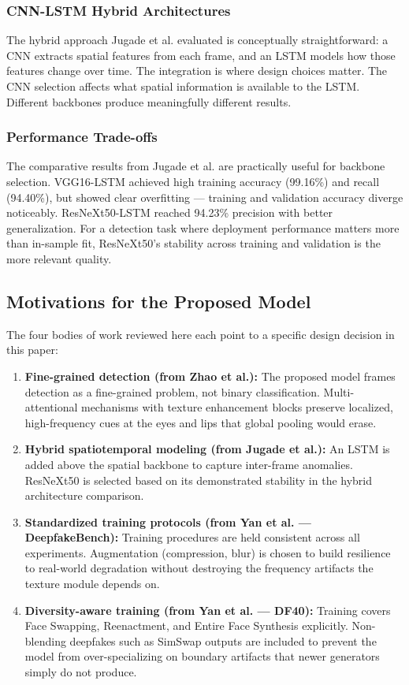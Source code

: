 \subsubsection{CNN-LSTM Hybrid Architectures}
The hybrid approach Jugade et al. evaluated is conceptually straightforward: a CNN extracts spatial features from each frame, and an LSTM models how those features change over time. The integration is where design choices matter. The CNN selection affects what spatial information is available to the LSTM. Different backbones produce meaningfully different results.

\subsubsection{Performance Trade-offs}
The comparative results from Jugade et al. are practically useful for backbone selection. VGG16-LSTM achieved high training accuracy (99.16\%) and recall (94.40\%), but showed clear overfitting — training and validation accuracy diverge noticeably. ResNeXt50-LSTM reached 94.23\% precision with better generalization. For a detection task where deployment performance matters more than in-sample fit, ResNeXt50's stability across training and validation is the more relevant quality.

\subsection{Motivations for the Proposed Model}
The four bodies of work reviewed here each point to a specific design decision in this paper:

\begin{enumerate}
    \item \textbf{Fine-grained detection (from Zhao et al.):} The proposed model frames detection as a fine-grained problem, not binary classification. Multi-attentional mechanisms with texture enhancement blocks preserve localized, high-frequency cues at the eyes and lips that global pooling would erase.

    \item \textbf{Hybrid spatiotemporal modeling (from Jugade et al.):} An LSTM is added above the spatial backbone to capture inter-frame anomalies. ResNeXt50 is selected based on its demonstrated stability in the hybrid architecture comparison.

    \item \textbf{Standardized training protocols (from Yan et al. — DeepfakeBench):} Training procedures are held consistent across all experiments. Augmentation (compression, blur) is chosen to build resilience to real-world degradation without destroying the frequency artifacts the texture module depends on.

    \item \textbf{Diversity-aware training (from Yan et al. — DF40):} Training covers Face Swapping, Reenactment, and Entire Face Synthesis explicitly. Non-blending deepfakes such as SimSwap outputs are included to prevent the model from over-specializing on boundary artifacts that newer generators simply do not produce.
\end{enumerate}
